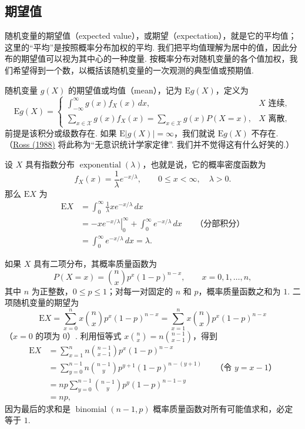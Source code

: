 \subsection{期望值}\label{sec:2.2}
随机变量的期望值（expected value），或期望（expectation），就是它的平均值；这里的“平均”是按照概率分布加权的平均. 我们把平均值理解为居中的值，因此分布的期望值可以视为其中心的一种度量. 按概率分布对随机变量的各个值加权，我们希望得到一个数，以概括该随机变量的一次观测的典型值或预期值.

\begin{definition}\label{def:2.2.1}
随机变量 $g(X)$ 的期望值或均值（mean），记为 $\mathrm E g(X)$，定义为
$$\mathrm E g(X)=\begin{cases}
\displaystyle\int_{-\infty}^\infty g(x)f_X(x)\,dx,&X\text{ 连续},\\
\displaystyle\sum_{x\in\mathscr X}g(x)f_X(x)=\sum_{x\in\mathscr X}g(x)P(X=x),&X\text{ 离散},
\end{cases}$$
前提是该积分或级数存在. 如果 $\mathrm E|g(X)|=\infty$，我们就说 $\mathrm E g(X)$ 不存在. （\hyperref[bib:source259]{Ross (1988)} 将此称为“无意识统计学家定律”. 我们并不觉得这有什么好笑的.）
\end{definition}

\begin{example}[指数分布的均值]\label{ex:2.2.2}
设 $X$ 具有指数分布 $\operatorname{exponential}(\lambda)$，也就是说，它的概率密度函数为
$$f_X(x)=\frac1\lambda e^{-x/\lambda},\qquad0\le x<\infty,\quad\lambda>0.$$
那么 $\mathrm EX$ 为
$$\begin{aligned}
\mathrm EX&=\int_0^\infty\frac1\lambda xe^{-x/\lambda}\,dx\\
&=\left.-xe^{-x/\lambda}\right|_0^\infty+\int_0^\infty e^{-x/\lambda}\,dx&&\text{（分部积分）}\\
&=\int_0^\infty e^{-x/\lambda}\,dx=\lambda.
\end{aligned}$$
\end{example}

\begin{example}[二项分布的均值]\label{ex:2.2.3}
如果 $X$ 具有二项分布，其概率质量函数为
$$P(X=x)=\binom nx p^x(1-p)^{n-x},\qquad x=0,1,\ldots,n,$$
其中 $n$ 为正整数，$0\le p\le1$；对每一对固定的 $n$ 和 $p$，概率质量函数之和为 $1$. 二项随机变量的期望为
$$\mathrm EX=\sum_{x=0}^n x\binom nx p^x(1-p)^{n-x}
=\sum_{x=1}^n x\binom nx p^x(1-p)^{n-x}$$
（$x=0$ 的项为 $0$）. 利用恒等式 $x\binom nx=n\binom{n-1}{x-1}$，得到
$$\begin{aligned}
\mathrm EX&=\sum_{x=1}^n n\binom{n-1}{x-1}p^x(1-p)^{n-x}\\
&=\sum_{y=0}^{n-1}n\binom{n-1}y p^{y+1}(1-p)^{n-(y+1)}&&\text{（令 $y=x-1$）}\\
&=np\sum_{y=0}^{n-1}\binom{n-1}y p^y(1-p)^{n-1-y}\\
&=np,
\end{aligned}$$
因为最后的求和是 $\operatorname{binomial}(n-1,p)$ 概率质量函数对所有可能值求和，必定等于 $1$.
\end{example}


